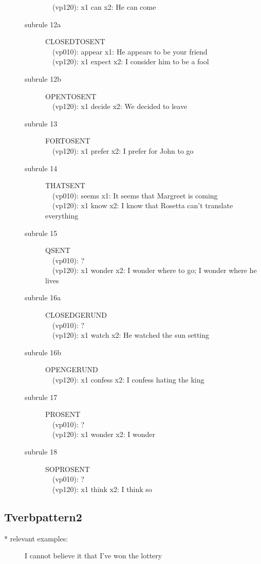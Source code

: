 \begin{description}
\begin{description}
\ \ (vp120): x1 can x2: He can come
\item [subrule 12a] CLOSEDTOSENT\\
\ \ (vp010): appear x1: He appears to be your friend\\
\ \ (vp120): x1 expect x2: I consider him to be a fool
\item [subrule 12b] OPENTOSENT\\
\ \ (vp120): x1 decide x2: We decided to leave
\item [subrule 13] FORTOSENT\\
\ \ (vp120): x1 prefer x2: I prefer for John to go
\item [subrule 14] THATSENT\\
\ \ (vp010): seems x1: It seems that Margreet is coming\\
\ \ (vp120): x1 know x2: I know that Rosetta can't translate everything
\item [subrule 15] QSENT\\
\ \ (vp010): ?\\
\ \ (vp120): x1 wonder x2: I wonder where to go; I wonder where he lives
\item [subrule 16a] CLOSEDGERUND\\
\ \ (vp010): ?\\
\ \ (vp120): x1 watch x2: He watched the sun setting
\item [subrule 16b] OPENGERUND\\
\ \ (vp120): x1 confess x2: I confess hating the king
\item [subrule 17] PROSENT\\
\ \ (vp010): ?\\
\ \ (vp120): x1 wonder x2: I wonder
\item [subrule 18] SOPROSENT\\
\ \ (vp010): ?\\
\ \ (vp120): x1 think x2: I think so\\
\end{description}
\end{description}

\subsection{Tverbpattern2}
\begin{description}
\item[* relevant examples:] I cannot believe it that I've won the lottery\
\end{description}


